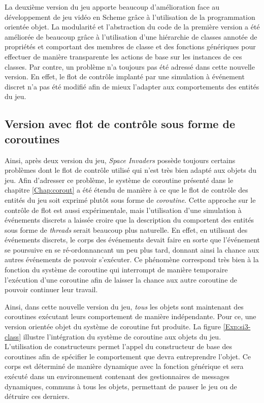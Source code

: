 \documentclass[12pt,oneside,letterpaper,francais]{book}
\newcommand{\si}{{\textit{Space Invaders }}}
\newcommand{\scheme}[1]{\selectlanguage{english}{\tt #1}\selectlanguage{french}}
\begin{document}
La deuxième version du jeu apporte beaucoup d'amélioration face au
développement de jeu vidéo en Scheme grâce à l'utilisation de la
programmation orientée objet. La modularité et l'abstraction du code
de la première version a été améliorée de beaucoup grâce à
l'utilisation d'une hiérarchie de classes annotée de propriétés et
comportant des membres de classe et des fonctions génériques pour
effectuer de manière transparente les actions de base sur les
instances de ces classes. Par contre, un problème n'a toujours pas été
adressé dans cette nouvelle version. En effet, le flot de contrôle
implanté par une simulation à événement discret n'a pas été modifié
afin de mieux l'adapter aux comportements des entités du jeu.


\subsection{Version avec flot de contrôle sous forme de coroutines}
\label{Exp:sp3}

Ainsi, après deux version du jeu, \si possède toujours certains
problèmes dont le flot de contrôle utilisé qui n'est très bien adapté
aux objets du jeu. Afin d'adresser ce problème, le système de
coroutine présenté dans le chapitre \ref{Chap:corout} a été étendu de
manière à ce que le flot de contrôle des entités du jeu soit exprimé
plutôt sous forme de \emph{coroutine}. Cette approche sur le contrôle
de flot est aussi expérimentale, mais l'utilisation d'une simulation à
événements discrets a laissée croire que la description du comportent
des entités sous forme de \textit{threads} serait beaucoup plus
naturelle. En effet, en utilisant des événements discrets, le corps
des événements devait faire en sorte que l'événement se poursuive en
se ré-ordonnancant un peu plus tard, donnant ainsi la chance aux
autres événements de pouvoir s'exécuter. Ce phénomène correspond très
bien à la fonction \scheme{yield} du système de coroutine qui
interrompt de manière temporaire l'exécution d'une coroutine afin de
laisser la chance aux autre coroutine de pouvoir continuer leur
travail.

Ainsi, dans cette nouvelle version du jeu, \emph{tous} les objets sont
maintenant des coroutines exécutant leurs comportement de manière
indépendante. Pour ce, une version orientée objet du système de
coroutine fut produite. La figure \ref{Exp:si3-class} illustre
l'intégration du système de coroutine aux objets du jeu. L'utilisation
de constructeurs permet l'appel du constructeur de base des coroutines
afin de spécifier le comportement que devra entreprendre l'objet. Ce
corps est déterminé de manière dynamique avec la fonction générique
\scheme{behaviour} et sera exécuté dans un environnement contenant des
gestionnaires de messages dynamiques, communs à tous les objets,
permettant de pauser le jeu ou de détruire ces derniers.
\end{document}
